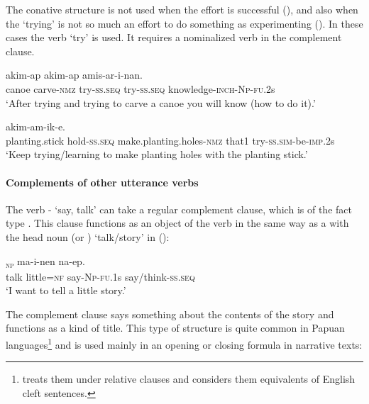 The conative structure is not used when the effort is successful (), and also when the `trying' is not so much an effort to do something as experimenting ().  In these cases the verb  `try' is used. It requires a nominalized verb in the complement clause. 

\ea%
\label{ex:x375}
  akim-ap  akim-ap amis-ar-i-nan.\\
canoe  carve-\textsc{nmz} try-\textsc{ss}.\textsc{seq} try-\textsc{ss}.\textsc{seq} knowledge-\textsc{inch}-\textsc{Np}-\textsc{fu}.2s\\
\glt`After trying and trying to carve a canoe you will know (how to do it).'
\z


\ea%
\label{ex:x376}
  akim-am-ik-e.\\
planting.stick hold-\textsc{ss}.\textsc{seq} make.planting.holes-\textsc{nmz} that1 try-\textsc{ss}.\textsc{sim}-be-\textsc{imp}.2s\\
\glt`Keep trying/learning to make planting holes with the planting stick.'
\z


\paragraph[Complements of other utterance verbs ]{Complements of other utterance verbs} 

The verb - `say, talk' can take a regular complement clause, which is of the fact type \citep[389]{Dixon2010b}. This clause functions as an object of the verb in the same way as a  with the head noun  (or ) `talk/story' in ():

\ea%
\label{ex:x1595}
\gll [Opora  gelemuta=ko]\textsubscript{\textsc{np}}  ma-i-nen  na-ep.\\
talk  little=\textsc{nf} say-\textsc{Np}-\textsc{fu}.1s say/think-\textsc{ss}.\textsc{seq}\\
\glt`I want to tell a little story.'
\z


The complement clause says something about the contents of the story and functions as a kind of title. This type of structure is quite common in Papuan languages\footnote{\citet[231]{Reesink1987} treats them under relative clauses and considers them equivalents of English cleft sentences.} and is used mainly in an opening or closing formula in narrative texts: 

